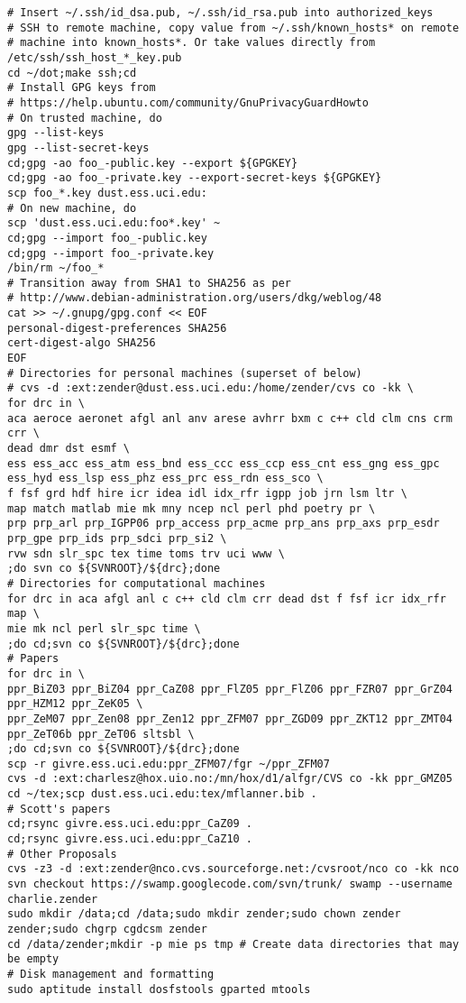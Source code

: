 \documentclass[12pt,twoside]{article}
\begin{document}
\begin{verbatim}
# Insert ~/.ssh/id_dsa.pub, ~/.ssh/id_rsa.pub into authorized_keys
# SSH to remote machine, copy value from ~/.ssh/known_hosts* on remote
# machine into known_hosts*. Or take values directly from /etc/ssh/ssh_host_*_key.pub
cd ~/dot;make ssh;cd
# Install GPG keys from
# https://help.ubuntu.com/community/GnuPrivacyGuardHowto
# On trusted machine, do
gpg --list-keys
gpg --list-secret-keys
cd;gpg -ao foo_-public.key --export ${GPGKEY}
cd;gpg -ao foo_-private.key --export-secret-keys ${GPGKEY}
scp foo_*.key dust.ess.uci.edu:
# On new machine, do
scp 'dust.ess.uci.edu:foo*.key' ~
cd;gpg --import foo_-public.key
cd;gpg --import foo_-private.key
/bin/rm ~/foo_*
# Transition away from SHA1 to SHA256 as per
# http://www.debian-administration.org/users/dkg/weblog/48
cat >> ~/.gnupg/gpg.conf << EOF
personal-digest-preferences SHA256
cert-digest-algo SHA256
EOF
# Directories for personal machines (superset of below)
# cvs -d :ext:zender@dust.ess.uci.edu:/home/zender/cvs co -kk \
for drc in \
aca aeroce aeronet afgl anl anv arese avhrr bxm c c++ cld clm cns crm crr \
dead dmr dst esmf \
ess ess_acc ess_atm ess_bnd ess_ccc ess_ccp ess_cnt ess_gng ess_gpc ess_hyd ess_lsp ess_phz ess_prc ess_rdn ess_sco \
f fsf grd hdf hire icr idea idl idx_rfr igpp job jrn lsm ltr \
map match matlab mie mk mny ncep ncl perl phd poetry pr \
prp prp_arl prp_IGPP06 prp_access prp_acme prp_ans prp_axs prp_esdr prp_gpe prp_ids prp_sdci prp_si2 \
rvw sdn slr_spc tex time toms trv uci www \
;do svn co ${SVNROOT}/${drc};done
# Directories for computational machines
for drc in aca afgl anl c c++ cld clm crr dead dst f fsf icr idx_rfr map \
mie mk ncl perl slr_spc time \
;do cd;svn co ${SVNROOT}/${drc};done
# Papers
for drc in \
ppr_BiZ03 ppr_BiZ04 ppr_CaZ08 ppr_FlZ05 ppr_FlZ06 ppr_FZR07 ppr_GrZ04 ppr_HZM12 ppr_ZeK05 \
ppr_ZeM07 ppr_Zen08 ppr_Zen12 ppr_ZFM07 ppr_ZGD09 ppr_ZKT12 ppr_ZMT04 ppr_ZeT06b ppr_ZeT06 sltsbl \
;do cd;svn co ${SVNROOT}/${drc};done
scp -r givre.ess.uci.edu:ppr_ZFM07/fgr ~/ppr_ZFM07
cvs -d :ext:charlesz@hox.uio.no:/mn/hox/d1/alfgr/CVS co -kk ppr_GMZ05 
cd ~/tex;scp dust.ess.uci.edu:tex/mflanner.bib .
# Scott's papers
cd;rsync givre.ess.uci.edu:ppr_CaZ09 .
cd;rsync givre.ess.uci.edu:ppr_CaZ10 .
# Other Proposals
cvs -z3 -d :ext:zender@nco.cvs.sourceforge.net:/cvsroot/nco co -kk nco
svn checkout https://swamp.googlecode.com/svn/trunk/ swamp --username charlie.zender
sudo mkdir /data;cd /data;sudo mkdir zender;sudo chown zender zender;sudo chgrp cgdcsm zender
cd /data/zender;mkdir -p mie ps tmp # Create data directories that may be empty
# Disk management and formatting
sudo aptitude install dosfstools gparted mtools 

\end{verbatim}
\end{document}
